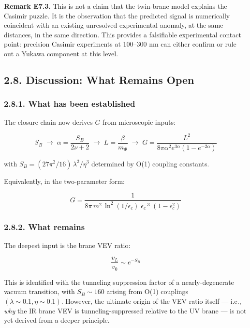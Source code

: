 \documentclass[
  11pt,
]{article}
\begin{document}
\textbf{Remark E7.3.} This is not a claim that the twin-brane model
explains the Casimir puzzle. It is the observation that the predicted
signal is numerically coincident with an existing unresolved
experimental anomaly, at the same distances, in the same direction. This
provides a falsifiable experimental contact point: precision Casimir
experiments at 100--300 nm can either confirm or rule out a Yukawa
component at this level.

\bigskip

\hypertarget{discussion-what-remains-open}{%
\subsection{2.8. Discussion: What Remains
Open}\label{discussion-what-remains-open}}

\hypertarget{what-has-been-established}{%
\subsubsection{2.8.1. What has been
established}\label{what-has-been-established}}

The closure chain now derives \(G\) from microscopic inputs:

\[\boxed{S_B \;\longrightarrow\; \alpha = \frac{S_B}{2\nu+2} \;\longrightarrow\; L = \frac{\beta}{m_\Phi} \;\longrightarrow\; G = \frac{L^2}{8\pi\alpha^2 e^{3\alpha}(1-e^{-2\alpha})}} \tag{91}\]

with \(S_B = (27\pi^2/16)\,\lambda^2/\eta^3\) determined by O(1)
coupling constants.

Equivalently, in the two-parameter form:

\[G = \frac{1}{8\pi\,m^2\,\ln^2(1/\epsilon_c)\;\epsilon_c^{-3}\;(1 - \epsilon_c^2)} \tag{92}\]

\hypertarget{what-remains}{%
\subsubsection{2.8.2. What remains}\label{what-remains}}

The deepest input is the brane VEV ratio:

\[\frac{v_L}{v_0} \sim e^{-S_B} \tag{93}\]

This is identified with the tunneling suppression factor of a
nearly-degenerate vacuum transition, with \(S_B \sim 160\) arising from
O(1) couplings \((\lambda \sim 0.1, \eta \sim 0.1)\). However, the
ultimate origin of the VEV ratio itself --- i.e., \emph{why} the IR
brane VEV is tunneling-suppressed relative to the UV brane --- is not
yet derived from a deeper principle.
\end{document}
